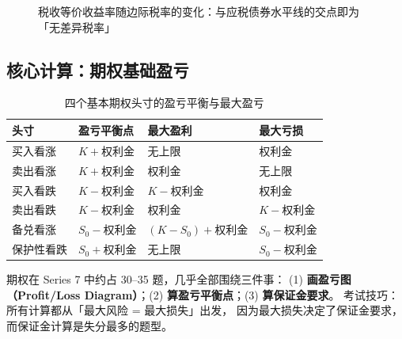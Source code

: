 \begin{figure}[htbp]
\centering
{}
\caption{税收等价收益率随边际税率的变化：与应税债券水平线的交点即为「无差异税率」}\label{fig:12-tey}
\end{figure}

\subsection{核心计算：期权基础盈亏}

\begin{table}[htbp]
\centering
\caption{四个基本期权头寸的盈亏平衡与最大盈亏}\label{tab:12-options}
\tablefont
\begin{tabular}{@{}L{2.6cm}L{3.0cm}L{3.0cm}L{4.0cm}@{}}
\toprule
\textbf{头寸} & \textbf{盈亏平衡点} & \textbf{最大盈利} & \textbf{最大亏损} \\
\midrule
买入看涨 & $K+\text{权利金}$ & 无上限 & 权利金 \\
卖出看涨 & $K+\text{权利金}$ & 权利金 & 无上限 \\
买入看跌 & $K-\text{权利金}$ & $K-\text{权利金}$ & 权利金 \\
卖出看跌 & $K-\text{权利金}$ & 权利金 & $K-\text{权利金}$ \\
\midrule
备兑看涨 & $S_0-\text{权利金}$ & $(K-S_0)+\text{权利金}$ & $S_0-\text{权利金}$ \\
保护性看跌 & $S_0+\text{权利金}$ & 无上限 & $S_0-\text{权利金}$ \\
\bottomrule
\end{tabular}
\end{table}

\begin{exambox}
期权在 Series 7 中约占 30--35 题，几乎全部围绕三件事：
(1) \textbf{画盈亏图（Profit/Loss Diagram）}；(2) \textbf{算盈亏平衡点}；(3) \textbf{算保证金要求}。
考试技巧：所有计算都从「最大风险 = 最大损失」出发，
因为最大损失决定了保证金要求，而保证金计算是失分最多的题型。
\end{exambox}


